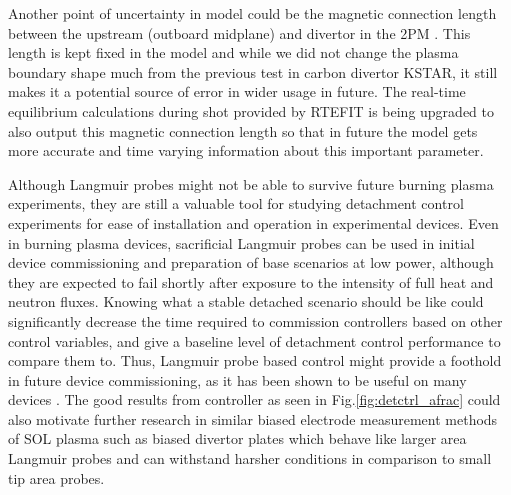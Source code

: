 Another point of uncertainty in \Afrac model could be the magnetic connection length between the upstream (outboard midplane) and divertor in the 2PM \cite{Leonard_2018_PPCF}.
This length is kept fixed in the model and while we did not change the plasma boundary shape much from the previous test \cite{Eldon_2022_PPCF} in carbon divertor KSTAR, it still makes it a potential source of error in wider usage in future.
The real-time equilibrium calculations during shot provided by RTEFIT is being upgraded to also output this magnetic connection length so that in future the model gets more accurate and time varying information about this important parameter.

Although Langmuir probes might not be able to survive future burning plasma experiments, they are still a valuable tool for studying detachment control experiments for ease of installation and operation in experimental devices.
Even in burning plasma devices, sacrificial Langmuir probes can be used in initial device commissioning and preparation of base scenarios at low power, although they are expected to fail shortly after exposure to the intensity of full heat and neutron fluxes.
Knowing what a stable detached scenario should be like could significantly decrease the time required to commission controllers based on other control variables, and give a baseline level of detachment control performance to compare them to.
Thus, Langmuir probe based control might provide a foothold in future device commissioning, as it has been shown to be useful on many devices \cite{Eldon_2021_NME, Guillemaut_2017_PPCF, Yuan_2020_FED, Khodunov_2021_PPCF}.
The good results from \Afrac controller as seen in Fig.\ref{fig:detctrl_afrac} could also motivate further research in similar biased electrode measurement methods of SOL plasma such as biased divertor plates \cite{Toi_2023_NF, Cui_2024_NF} which behave like larger area Langmuir probes and can withstand harsher conditions in comparison to small tip area probes.

